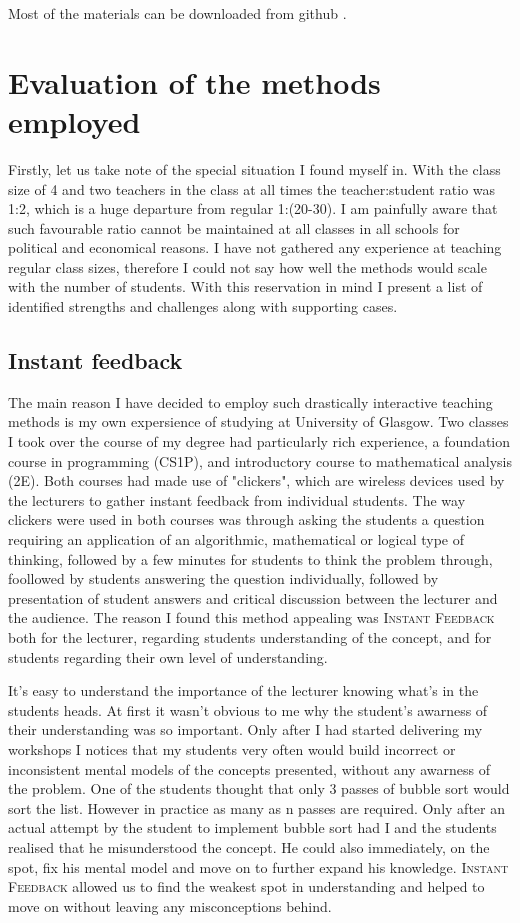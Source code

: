 \documentclass[12pt]{article}
\begin{document}
Most of the materials can be downloaded from github \parencite{practicingFoundations, SelectionSortVB, VMWorkshops}.

\section{Evaluation of the methods employed}
Firstly, let us take note of the special situation I found myself in. With the class size of 4 and two teachers in the class at all times the teacher:student ratio was 1:2, which is a huge departure from regular 1:(20-30). I am painfully aware that such favourable ratio cannot be maintained at all classes in all schools for political and economical reasons. I have not gathered any experience at teaching regular class sizes, therefore I could not say how well the methods would scale with the number of students. With this reservation in mind I present a list of identified strengths and challenges along with supporting cases. 

\subsection{Instant feedback}
The main reason I have decided to employ such drastically interactive teaching methods is my own expersience of studying at University of Glasgow. Two classes I took over the course of my degree had particularly rich experience, a foundation course in programming (CS1P), and introductory course to mathematical analysis (2E). Both courses had made use of "clickers", which are wireless devices used by the lecturers to gather instant feedback from individual students. The way clickers were used in both courses was through asking the students a question requiring an application of an algorithmic, mathematical or logical type of thinking, followed by a few minutes for students to think the problem through, foollowed by students answering the question individually, followed by presentation of student answers and critical discussion between the lecturer and the audience. The reason I found this method appealing  was \textsc{Instant Feedback} both for the lecturer, regarding students understanding of the concept, and for students regarding their own level of understanding.

It's easy to understand the importance of the lecturer knowing what's in the students heads. At first it wasn't obvious to me why the student's awarness of their understanding was so important. Only after I had started delivering my workshops I notices that my students very often would build incorrect or inconsistent mental models of the concepts presented, without any awarness of the problem. One of the students thought that only 3 passes of bubble sort would sort the list. However in practice as many as n passes are required. Only after an actual attempt by the student to implement bubble sort had I and the students realised that he misunderstood the concept. He could also immediately, on the spot, fix his mental model and move on to further expand his knowledge. \textsc{Instant Feedback} allowed us to find the weakest spot in understanding and helped to move on without leaving any misconceptions behind.
\end{document}
